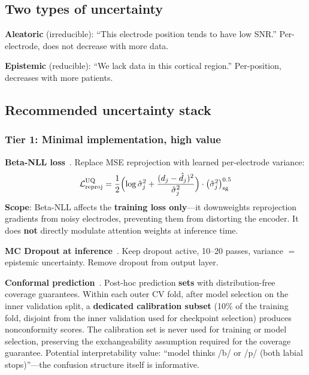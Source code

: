 \documentclass[11pt,letterpaper]{article}
\begin{document}
\subsection{Two types of uncertainty}

\textbf{Aleatoric} (irreducible): ``This electrode position tends to have low SNR.'' Per-electrode, does not decrease with more data.

\textbf{Epistemic} (reducible): ``We lack data in this cortical region.'' Per-position, decreases with more patients.

\subsection{Recommended uncertainty stack}

\subsubsection{Tier 1: Minimal implementation, high value}

\textbf{Beta-NLL loss}~\cite{seitzer2022}. Replace MSE reprojection with learned per-electrode variance:
\begin{equation}
\mathcal{L}_{\text{reproj}}^{\text{UQ}} = \frac{1}{2}\Bigl(\log \hat{\sigma}_j^2 + \frac{(d_j - \hat{d}_j)^2}{\hat{\sigma}_j^2}\Bigr) \cdot \bigl(\hat{\sigma}_j^2\bigr)^{0.5}_{\text{sg}}
\end{equation}
\textbf{Scope}: Beta-NLL affects the \textbf{training loss only}---it downweights reprojection gradients from noisy electrodes, preventing them from distorting the encoder. It does \textbf{not} directly modulate attention weights at inference time.

\textbf{MC Dropout at inference}~\cite{gal2016}. Keep dropout active, 10--20 passes, variance $=$ epistemic uncertainty. Remove dropout from output layer.

\textbf{Conformal prediction}~\cite{angelopoulos2021}. Post-hoc prediction \textbf{sets} with distribution-free coverage guarantees. Within each outer CV fold, after model selection on the inner validation split, a \textbf{dedicated calibration subset} (10\% of the training fold, disjoint from the inner validation used for checkpoint selection) produces nonconformity scores. The calibration set is never used for training or model selection, preserving the exchangeability assumption required for the coverage guarantee. Potential interpretability value: ``model thinks /b/ or /p/ (both labial stops)''---the confusion structure itself is informative.
\end{document}

